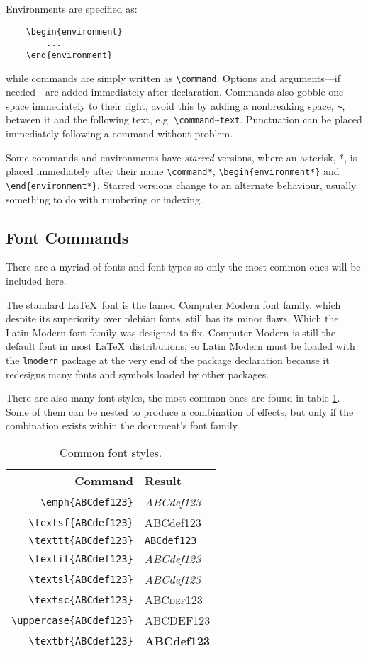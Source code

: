 Environments are specified as:
\begin{verbatim}
	\begin{environment}
	    ...
	\end{environment}
\end{verbatim}
while commands are simply written as \verb|\command|.  Options and
arguments---if needed---are added immediately after declaration.
Commands also gobble one space immediately to their right, avoid this
by adding a nonbreaking space, \verb|~|, between it and the following
text, e.g. \verb|\command~text|.  Punctuation can be placed
immediately following a command without problem.

Some commands and environments have \emph{starred} versions, where an
asterisk, *, is placed immediately after their name \verb|\command*|,
\verb|\begin{environment*}| and \verb|\end{environment*}|.  Starred
versions change to an alternate behaviour, usually something to do
with numbering or indexing.
%
\subsection{Font Commands}
%
There are a myriad of fonts and font types so only the most common
ones will be included here.

The standard \LaTeX~font is the famed Computer Modern font family,
which despite its superiority over plebian fonts, still has its minor
flaws.  Which the Latin Modern font family was designed to fix.
Computer Modern is still the default font in most
\LaTeX~distributions, so Latin Modern must be loaded with the
\verb|lmodern| package at the very end of the package declaration
because it redesigns many fonts and symbols loaded by other packages.

There are also many font styles, the most common ones are found in
table \ref{t:font}.  Some of them can be nested to produce a
combination of effects, but only if the combination exists within the
document's font family.
\begin{table}[!htbp]
  \centering
  \caption{Common font styles.}
  \label{t:font}
  \begin{tabular}{rl}
    \toprule
    Command & Result \\
    \midrule
    \verb|\emph{ABCdef123}| & \emph{ABCdef123}  \\
    \verb|\textsf{ABCdef123}| & \textsf{ABCdef123} \\
    \verb|\texttt{ABCdef123}| & \texttt{ABCdef123} \\
    \verb|\textit{ABCdef123}| & \textit{ABCdef123} \\
    \verb|\textsl{ABCdef123}| & \textsl{ABCdef123} \\
    \verb|\textsc{ABCdef123}| & \textsc{ABCdef123}  \\
    \verb|\uppercase{ABCdef123}| & \uppercase{ABCdef123} \\
    \verb|\textbf{ABCdef123}| & \textbf{ABCdef123} \\
    \bottomrule
  \end{tabular}
\end{table}

